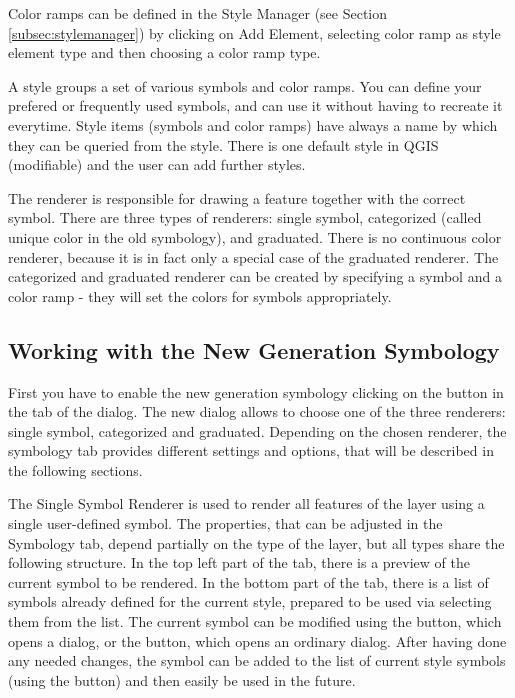 Color ramps can be defined in the Style Manager (see Section 
\ref{subsec:stylemanager}) by clicking on Add Element, selecting color ramp 
as style element type and then choosing a color ramp type.


A style groups a set of various symbols and color ramps. You can define your 
prefered or frequently used symbols, and can use it  without having to recreate 
it everytime. Style items (symbols and color ramps) have always a name by which 
they can be queried from the style. There is one default style in QGIS (modifiable) 
and the user can add further styles.


The renderer is responsible for drawing a feature together with the correct 
symbol. There are three types of renderers: single symbol, categorized (called 
unique color in the old symbology), and graduated. There is no continuous color 
renderer, because it is in fact only a special case of the graduated renderer. 
The categorized and graduated renderer can be created by specifying a symbol 
and a color ramp - they will set the colors for symbols appropriately. 

\subsection{Working with the New Generation Symbology}

First you have to enable the new generation symbology clicking on the 
 button in the  tab of the 
 dialog. The new dialog allows to choose one of the 
three renderers: single symbol, categorized and graduated. Depending on the 
chosen renderer, the symbology tab provides different settings and options, that 
will be described in the following sections.


The Single Symbol Renderer is used to render all features of the layer using a 
single user-defined symbol. The properties, that can be adjusted in the 
Symbology tab, depend partially on the type of the layer, but all types share 
the following structure. In the top left part of the tab, there is a preview of 
the current symbol to be rendered. In the bottom part of the tab, there is a 
list of symbols already defined for the current style, prepared to be used via 
selecting them from the list. The current symbol can be modified using the 
 button, which opens a  dialog, or 
the  button, which opens an ordinary  dialog.
After having done any needed changes, the symbol can be added to the list of 
current style symbols (using the  button) and then easily 
be used in the future.
 
